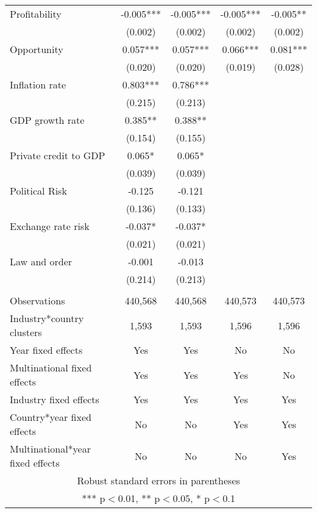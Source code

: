 \begin{tabular}{lcccc}
Profitability & -0.005*** & -0.005*** & -0.005*** & -0.005** \\
 & (0.002) & (0.002) & (0.002) & (0.002) \\
Opportunity & 0.057*** & 0.057*** & 0.066*** & 0.081*** \\
 & (0.020) & (0.020) & (0.019) & (0.028) \\
Inflation rate & 0.803*** & 0.786*** &  &  \\
 & (0.215) & (0.213) &  &  \\
GDP growth rate & 0.385** & 0.388** &  &  \\
 & (0.154) & (0.155) &  &  \\
Private credit to GDP & 0.065* & 0.065* &  &  \\
 & (0.039) & (0.039) &  &  \\
Political Risk & -0.125 & -0.121 &  &  \\
 & (0.136) & (0.133) &  &  \\
Exchange rate risk & -0.037* & -0.037* &  &  \\
 & (0.021) & (0.021) &  &  \\
Law and order & -0.001 & -0.013 &  &  \\
 & (0.214) & (0.213) &  &  \\
 &  &  &  &  \\
Observations & 440,568 & 440,568 & 440,573 & 440,573 \\
Industry*country clusters & 1,593 & 1,593 & 1,596 & 1,596 \\
Year fixed effects & Yes & Yes & No & No \\
Multinational fixed effects & Yes & Yes & Yes & No \\
Industry fixed effects & Yes & Yes & Yes & Yes \\
Country*year fixed effects & No & No & Yes & Yes \\
 Multinational*year fixed effects & No & No & No & Yes \\ \hline
\multicolumn{5}{c}{ Robust standard errors in parentheses} \\
\multicolumn{5}{c}{ *** p$<$0.01, ** p$<$0.05, * p$<$0.1} \\
\end{tabular}
